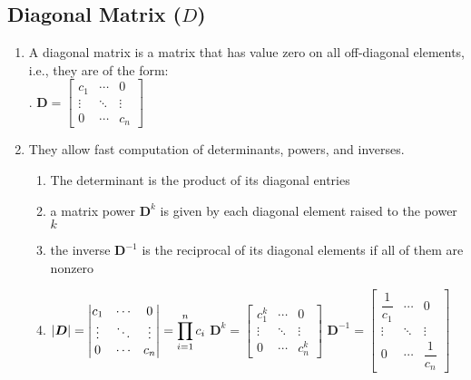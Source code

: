 \subsection{Diagonal Matrix ($D$)}


\begin{enumerate}
    \item A diagonal matrix is a matrix that has value zero on all off-diagonal elements, i.e., they are of the form:
    \hfill \cite{mfml/book/mml/Deisenroth-Faisal-Ong}
    \\
    .\hfill
    $
        \bm{D} = \begin{bmatrix}
        c_1 & \cdots & 0 \\
        \vdots & \ddots & \vdots \\
        0 & \cdots & c_n
        \end{bmatrix}
    $
    \hfill \cite{mfml/book/mml/Deisenroth-Faisal-Ong}

    \item They allow fast computation of determinants, powers, and inverses.
    \begin{enumerate}
        \item The determinant is the product of its diagonal entries
        \hfill \cite{mfml/book/mml/Deisenroth-Faisal-Ong}
        
        \item a matrix power $\bm{D}^k$ is given by each diagonal element raised to the power $k$
        \hfill \cite{mfml/book/mml/Deisenroth-Faisal-Ong}
        
        \item the inverse $\bm{D}^{-1}$ is the reciprocal of its diagonal elements if all of them are nonzero
        \hfill \cite{mfml/book/mml/Deisenroth-Faisal-Ong}
        
        \item[] 
        $
            \left| \bm{D} \right| 
            = \begin{vmatrix}
                c_1 & \cdots & 0 \\
                \vdots & \ddots & \vdots \\
                0 & \cdots & c_n
            \end{vmatrix}
            = \displaystyle\prod_{i=1}^n c_i
        $
        \hfill
        $
            \bm{D}^k 
            = \begin{bmatrix}
                c_1^k & \cdots & 0 \\
                \vdots & \ddots & \vdots \\
                0 & \cdots & c_n^k
            \end{bmatrix}
        $
        \hfill
        $
            \bm{D}^{-1} 
            = \begin{bmatrix}
                \dfrac{1}{c_1} & \cdots & 0 \\
                \vdots & \ddots & \vdots \\
                0 & \cdots & \dfrac{1}{c_n}
            \end{bmatrix}
        $
    \end{enumerate}


\end{enumerate}
